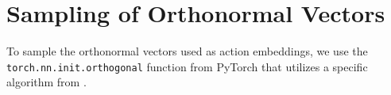 \section{Sampling of Orthonormal Vectors}
\label{appendix:orthonormal_vectors}
To sample the orthonormal vectors used as action embeddings, we use the \texttt{torch.nn.init.orthogonal} function from PyTorch \citep{NEURIPS2019_9015} that utilizes a specific algorithm from \citet{saxe2013exact}.
